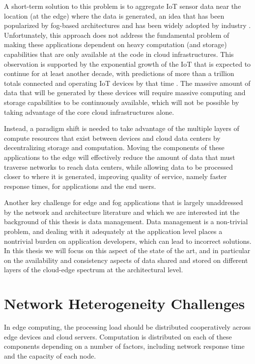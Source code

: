 A short-term solution \cite{bonomi2012fog} to this problem is to aggregate IoT
sensor data near the location (at the edge) where the data is generated, 
an idea that has been popularized by fog-based architectures and has been
widely adopted by industry \cite{yi2015survey}.
Unfortunately,
this approach does not address the fundamental problem of making these 
applications dependent on heavy computation (and storage) capabilities 
that are only available at the code in cloud infrastructures.
This observation is supported by the exponential growth of the IoT that is 
expected to continue for at least another decade, with predictions of more 
than a trillion totals connected and operating IoT devices by that time 
\cite{bol2019etictslides}. 
The massive amount of data that will be generated by these devices will require 
massive computing and storage capabilities to be continuously available,
which will not be possible by taking advantage of the core cloud infrastructures
alone.

Instead, a paradigm shift is needed to take advantage of the multiple layers of 
compute resources that exist between devices and cloud data centers by
decentralizing storage and computation.
Moving the components of these applications to the edge will effectively reduce
the amount of data that must traverse networks to reach data centers,
while allowing data to be processed closer to where it is generated,
improving quality of service,
namely faster response times,
for applications and the end users.

Another key challenge for edge and fog applications that is largely unaddressed
by the network and architecture literature and which we are interested 
int the background of this thesis is data management.
Data management is a non-trivial problem,
and dealing with it adequately at the application level places a nontrivial 
burden on application developers, which can lead to incorrect solutions.
In this thesis we will focus on this aspect of the state of the art,
and in particular on the availability and consistency aspects of data shared and
stored on different layers of the cloud-edge spectrum at the architectural 
level.

\section{Network Heterogeneity Challenges}
\label{sec:network-heterogeneity-challenges}
In edge computing,
the processing load should be distributed cooperatively across edge devices and cloud
servers.
Computation is distributed on each of these components depending on a number 
of factors, including network response time and the capacity of each node.

